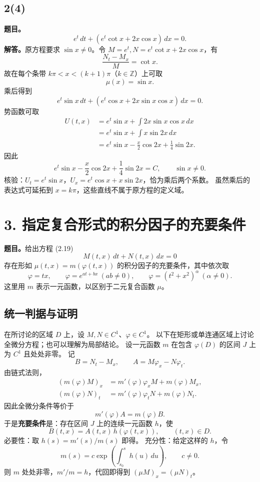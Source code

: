 \documentclass[11pt,a4paper]{ctexart}
\begin{document}
\subsection*{2(4)}
\textbf{题目。}
\[e^t\,dt+(e^t\cot x+2x\cos x)\,dx=0.\]
\textbf{解答。}原方程要求 $\sin x\ne0$。令 $M=e^t,N=e^t\cot x+2x\cos x$，有
\[\frac{N_t-M_x}{M}=\cot x.
\]
故在每个条带 $k\pi<x<(k+1)\pi$（$k\in\mathbb Z$）上可取
\[\boxed{\mu(x)=\sin x.}\]
乘后得到
\[e^t\sin x\,dt+(e^t\cos x+2x\sin x\cos x)\,dx=0.
\]
势函数可取
\begin{align*}
U(t,x)&=e^t\sin x+\int 2x\sin x\cos x\,dx\\
&=e^t\sin x+\int x\sin 2x\,dx\\
&=e^t\sin x-\frac{x}{2}\cos 2x+\frac14\sin 2x.
\end{align*}
因此
\[\boxed{e^t\sin x-\frac{x}{2}\cos 2x+\frac14\sin 2x=C,
\qquad \sin x\ne0.}\]
核验：$U_t=e^t\sin x$，$U_x=e^t\cos x+x\sin2x$，恰为乘后两个系数。
虽然乘后的表达式可延拓到 $x=k\pi$，这些直线不属于原方程的定义域。

\section*{3. 指定复合形式的积分因子的充要条件}
\textbf{题目。}给出方程 (2.19)
\[M(t,x)\,dt+N(t,x)\,dx=0\]
存在形如 $\mu(t,x)=m(\varphi(t,x))$ 的积分因子的充要条件，其中依次取
\[\varphi=tx,\qquad \varphi=e^{at+bx}\ (ab\ne0),\qquad
\varphi=(t^2+x^2)^\alpha\ (\alpha\ne0).
\]
这里用 $m$ 表示一元函数，以区别于二元复合函数 $\mu$。

\subsection*{统一判据与证明}
在所讨论的区域 $D$ 上，设 $M,N\in C^1$、$\varphi\in C^1$。
以下在矩形或单连通区域上讨论全微分方程；也可以理解为局部结论。
设一元函数 $m$ 在包含 $\varphi(D)$ 的区间 $J$ 上为 $C^1$ 且处处非零。
记
\[B=N_t-M_x,\qquad A=M\varphi_x-N\varphi_t.
\]
由链式法则，
\begin{align*}
(m(\varphi)M)_x&=m'(\varphi)\varphi_xM+m(\varphi)M_x,\\
(m(\varphi)N)_t&=m'(\varphi)\varphi_tN+m(\varphi)N_t.
\end{align*}
因此全微分条件等价于
\[m'(\varphi)A=m(\varphi)B.
\]
于是\textbf{充要条件}是：存在区间 $J$ 上的连续一元函数 $h$，使
\[\boxed{B(t,x)=A(t,x)\,h(\varphi(t,x)),\qquad (t,x)\in D.}\]
必要性：取 $h(s)=m'(s)/m(s)$ 即得。
充分性：给定这样的 $h$，令
\[\boxed{m(s)=c\exp\left(\int_{s_0}^{s}h(u)\,du\right),\qquad c\ne0.}\]
则 $m$ 处处非零，$m'/m=h$，代回即得到 $(\mu M)_x=(\mu N)_t$。
\end{document}

